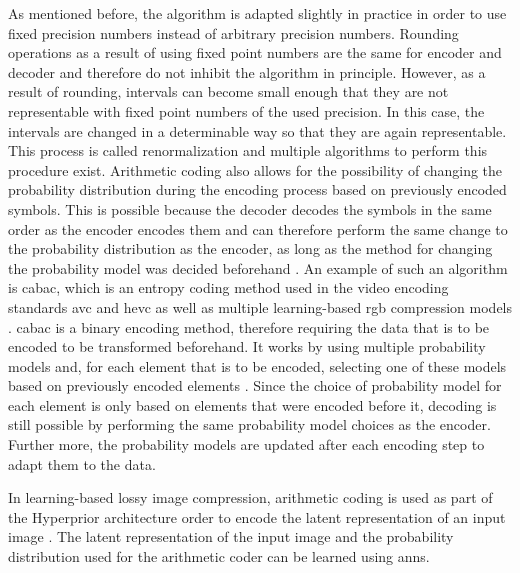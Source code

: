 As mentioned before, the algorithm is adapted slightly in practice in order to use fixed precision numbers instead of arbitrary precision numbers. Rounding operations as a result of using fixed point numbers are the same for encoder and decoder and therefore do not inhibit the algorithm in principle. However, as a result of rounding, intervals can become small enough that they are not representable with fixed point numbers of the used precision. In this case, the intervals are changed in a determinable way so that they are again representable. This process is called renormalization and multiple algorithms to perform this procedure exist.
Arithmetic coding also allows for the possibility of changing the probability distribution during the encoding process based on previously encoded symbols. This is possible because the decoder decodes the symbols in the same order as the encoder encodes them and can therefore perform the same change to the probability distribution as the encoder, as long as the method for changing the probability model was decided beforehand \citep{said_introduction_2023}. An example of such an algorithm is \ac{cabac}, which is an entropy coding method used in the video encoding standards \ac{avc} and \ac{hevc} as well as multiple learning-based \ac{rgb} compression models \citep{balle_end--end_2017,balle_variational_2018,minnen_joint_2018}. \Ac{cabac} is a binary encoding method, therefore requiring the data that is to be encoded to be transformed beforehand. It works by using multiple probability models and, for each element that is to be encoded, selecting one of these models based on previously encoded elements \citep{sze_high_2012}. Since the choice of probability model for each element is only based on elements that were encoded before it, decoding is still possible by performing the same probability model choices as the encoder. Further more, the probability models are updated after each encoding step to adapt them to the data.

In learning-based lossy image compression, arithmetic coding is used as part of the Hyperprior architecture order to encode the latent representation of an input image \citep{balle_end--end_2017,minnen_joint_2018,balle_variational_2018}. The latent representation of the input image and the probability distribution used for the arithmetic coder can be learned using \acp{ann}.

